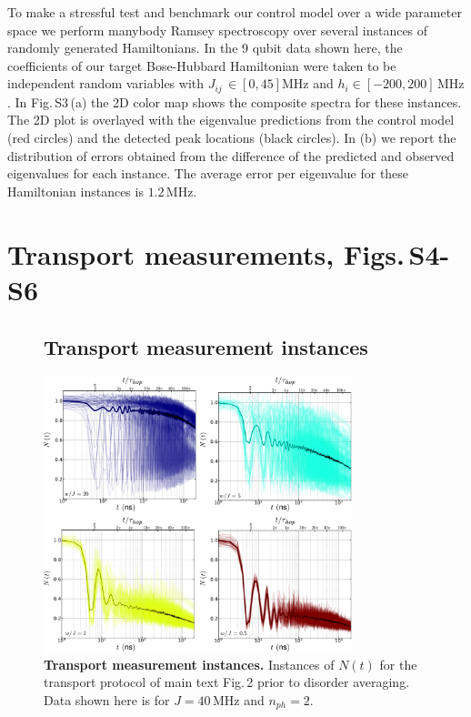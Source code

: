     To make a stressful test and benchmark our control model over a wide parameter space we perform manybody Ramsey spectroscopy over several instances of randomly generated Hamiltonians.
    In the 9 qubit data shown here, the coefficients of our target Bose-Hubbard Hamiltonian were taken to be independent random variables with $J_{ij}\, \in[0, 45] \text{MHz}$ and $h_{i} \in[-200, 200] \, \text{MHz}$.
    In Fig.\,S3\,(a) the 2D color map shows the composite spectra for these instances.  The 2D plot is overlayed with the eigenvalue predictions from the control model (red circles) and the detected peak locations (black circles).
    In (b) we report the distribution of errors obtained from the difference of the predicted and observed eigenvalues for each instance.
    The average error per eigenvalue for these Hamiltonian instances is $1.2 \, \text{MHz}$.

\section{Transport measurements, Figs.\,S4-S6}
\begin{figure}[h!]
    \subsection{Transport measurement instances}
    \centering
    \includegraphics[width=0.8\textwidth, keepaspectratio]{./PDF/fs4_190625_150p.pdf}
    \caption{\textbf{Transport measurement instances.}
    Instances of $N \left( t \right)$ for the transport protocol of main text Fig.\,2 prior to disorder averaging.  Data shown here is for $J=40 \, \text{MHz}$ and $n_{ph}=2$.
    }
    \end{figure}

